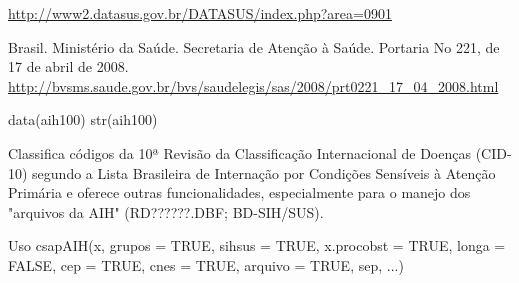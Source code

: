 \documentclass[letterpaper]{book}
\begin{document}
%
\begin{Source}\relax
\url{http://www2.datasus.gov.br/DATASUS/index.php?area=0901}

\end{Source}
%
\begin{References}\relax

Brasil. Ministério da Saúde. Secretaria de Atenção à Saúde. Portaria No 221, de 17 de abril de 2008. \url{http://bvsms.saude.gov.br/bvs/saudelegis/sas/2008/prt0221_17_04_2008.html}
\end{References}
%
\begin{Examples}
\begin{ExampleCode}
data(aih100)
str(aih100)
\end{ExampleCode}
\end{Examples}
%
\begin{Description}\relax

Classifica códigos da 10ª Revisão da Classificação Internacional de Doenças (CID-10) segundo a Lista Brasileira de Internação por Condições Sensíveis à Atenção Primária e oferece outras funcionalidades, especialmente para o manejo dos "arquivos da AIH" (RD??????.DBF; BD-SIH/SUS). 

\end{Description}
%
\begin{Section}{Uso}
csapAIH(x, grupos = TRUE, 
sihsus = TRUE, x.procobst = TRUE, longa = FALSE,
cep = TRUE, cnes = TRUE, arquivo = TRUE, sep, ...)
\end{Section}
%
\end{document}
